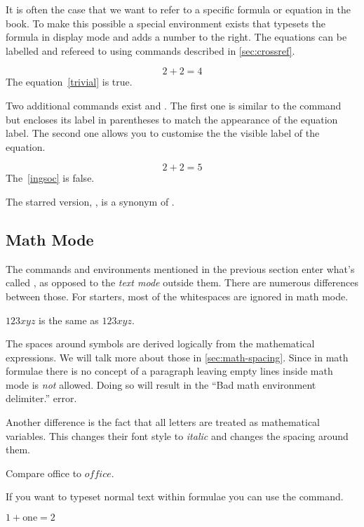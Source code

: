 It is often the case that we want to refer to a specific formula or equation in
the book. To make this possible a special  environment exists that
typesets the formula in display mode and adds a number to the right. The
equations can be labelled and refereed to using commands described in
\autoref{sec:crossref}.
\begin{example}
\begin{equation}
  \label{trivial}
  2 + 2 = 4
\end{equation}
The equation~\ref{trivial}
is true.
\end{example}
Two additional commands exist  and . The first one is
similar to the  command but encloses its label in parentheses to match
the appearance of the equation label. The second one allows you to customise
the the visible label of the equation.
\begin{example}
\begin{equation}
  \tag{Ingsoc's theorem}
  \label{ingsoc}
  2 + 2 = 5
\end{equation}
The~\eqref{ingsoc} is false.
\end{example}
The starred version, , is a synonym of \csi{[}.

\subsection{Math Mode}

The commands and environments mentioned in the previous section enter what's
called \emph{}, as opposed to the \emph{text mode} outside them.
There are numerous differences between those. For starters, most of the
whitespaces are ignored in math mode.
\begin{example}
\(123xyz\) is the same as \(
  1 2 3 x y z
\).
\end{example}
The spaces around symbols are derived logically from the mathematical
expressions. We will talk more about those in \autoref{sec:math-spacing}. Since
in math formulae there is no concept of a paragraph leaving empty lines inside
math mode is \emph{not} allowed. Doing so will result in the \enquote{Bad math
  environment delimiter.} error.

Another difference is the fact that all letters are treated as mathematical
variables. This changes their font style to \textit{italic} and changes the
spacing around them.
\begin{example}
Compare office to \(office\).
\end{example}
If you want to typeset normal text within formulae you can use the 
command.
\begin{example}
\( 1 + \text{one} = 2\)
\end{example}


